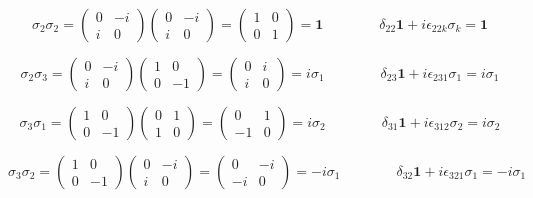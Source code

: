 \documentclass[12pt]{article}
\begin{document}
$$\sigma_2 \sigma_2 = \begin{pmatrix} 0 & -i \\ i & 0 \end{pmatrix} \begin{pmatrix} 0 & -i \\ i & 0 \end{pmatrix} = \begin{pmatrix} 1 & 0 \\ 0 & 1 \end{pmatrix} = \textbf{1} \qquad \qquad \delta_{22}\textbf{1} + i \epsilon_{22k} \sigma_k = \textbf{1}$$

$$\sigma_2 \sigma_3 = \begin{pmatrix} 0 & -i \\ i & 0 \end{pmatrix} \begin{pmatrix} 1 & 0 \\ 0 & -1 \end{pmatrix} = \begin{pmatrix} 0 & i \\ i & 0 \end{pmatrix} = i \sigma_1 \qquad \qquad \delta_{23}\textbf{1} + i \epsilon_{231} \sigma_1 = i \sigma_1$$

$$\sigma_3 \sigma_1 = \begin{pmatrix} 1 & 0 \\ 0 & -1 \end{pmatrix} \begin{pmatrix} 0 & 1 \\ 1 & 0 \end{pmatrix} = \begin{pmatrix} 0 & 1 \\ -1 & 0 \end{pmatrix} = i \sigma_2 \qquad \qquad \delta_{31}\textbf{1} + i \epsilon_{312} \sigma_2 = i \sigma_2$$

$$\sigma_3 \sigma_2 = \begin{pmatrix} 1 & 0 \\ 0 & -1 \end{pmatrix} \begin{pmatrix} 0 & -i \\ i & 0 \end{pmatrix} = \begin{pmatrix} 0 & -i \\ -i & 0 \end{pmatrix} = -i \sigma_1 \qquad \qquad \delta_{32}\textbf{1} + i \epsilon_{321} \sigma_1 = -i \sigma_1$$
\end{document}
